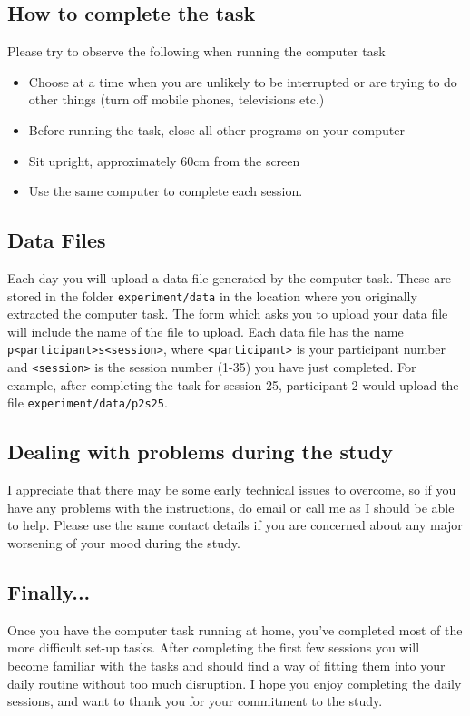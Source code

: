 \subsection{How to complete the task}

Please try to observe the following when running the computer task

\begin{itemize}
\item Choose at a time when you are unlikely to be interrupted or are trying to do other things (turn off mobile phones,
televisions etc.)
\item Before running the task, close all other programs on your computer
\item Sit upright, approximately 60cm from the screen
\item Use the same computer to complete each session.
\end{itemize}

\subsection{Data Files}

Each day you will upload a data file generated by the computer
task. These are stored in the folder \texttt{experiment/data}
in the location where you originally extracted the computer
task. The form which asks you to upload your data file will
include the name of the file to upload. Each data file has the name
\texttt{p{\textless}participant{\textgreater}s{\textless}session{\textgreater}},
where \texttt{{\textless}participant{\textgreater}} is your participant
number and \texttt{{\textless}session{\textgreater}} is the session
number (1-35) you have just completed. For example, after completing
the task for session 25, participant 2 would upload the file
\texttt{experiment/data/p2s25}.

\subsection{Dealing with problems during the study}

I appreciate that there may be some early technical issues to overcome,
so if you have any problems with the instructions, do email or call me
as I should be able to help. Please use the same contact details if you
are concerned about any major worsening of your mood during the study.

\subsection{Finally...}

Once you have the computer task running at home, you've completed most
of the more difficult set-up tasks. After completing the first few
sessions you will become familiar with the tasks and should find a way
of fitting them into your daily routine without too much disruption. I
hope you enjoy completing the daily sessions, and want to thank you for
your commitment to the study.
